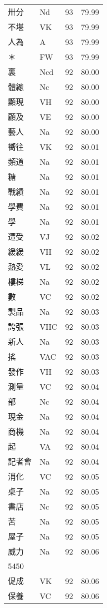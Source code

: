\documentclass[twocolumn]{book}
\begin{document}
\begin{supertabular}{llrr}
卅分 & Nd & 93 &  79.99\\
不堪 & VK & 93 &  79.99\\
人為 & A & 93 &  79.99\\
＊ & FW & 93 &  79.99\\
裏 & Ncd & 92 &  80.00\\
體總 & Nc & 92 &  80.00\\
顯現 & VH & 92 &  80.00\\
顧及 & VE & 92 &  80.00\\
藝人 & Na & 92 &  80.00\\
嚮往 & VK & 92 &  80.01\\
頻道 & Na & 92 &  80.01\\
糖 & Na & 92 &  80.01\\
戰績 & Na & 92 &  80.01\\
學費 & Na & 92 &  80.01\\
學 & Na & 92 &  80.01\\
遭受 & VJ & 92 &  80.02\\
緩緩 & VH & 92 &  80.02\\
熱愛 & VL & 92 &  80.02\\
樓梯 & Na & 92 &  80.02\\
數 & VC & 92 &  80.02\\
製品 & Na & 92 &  80.03\\
誇張 & VHC & 92 &  80.03\\
新人 & Na & 92 &  80.03\\
搖 & VAC & 92 &  80.03\\
發作 & VH & 92 &  80.03\\
測量 & VC & 92 &  80.04\\
部 & Nc & 92 &  80.04\\
現金 & Na & 92 &  80.04\\
商機 & Na & 92 &  80.04\\
起 & VA & 92 &  80.04\\
記者會 & Na & 92 &  80.04\\
消化 & VC & 92 &  80.05\\
桌子 & Na & 92 &  80.05\\
書店 & Nc & 92 &  80.05\\
苦 & Na & 92 &  80.05\\
屋子 & Na & 92 &  80.05\\
威力 & Na & 92 &  80.06\\
5450\\
促成 & VK & 92 &  80.06\\
保養 & VC & 92 &  80.06\\

\end{supertabular}
\end{document}
